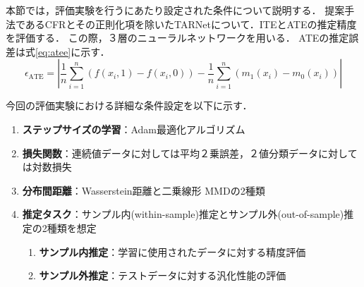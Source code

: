\documentclass[dvipdfmx]{jreport}
\begin{document}
本節では，評価実験を行うにあたり設定された条件について説明する．
提案手法であるCFRとその正則化項を除いたTARNetについて．ITEとATEの推定精度を評価する．
この際，３層のニューラルネットワークを用いる．
ATEの推定誤差は式\eqref{eq:atee}に示す．
\begin{equation}
    \epsilon_{\mathrm{ATE}} = \left| \frac{1}{n} \sum_{i=1}^{n} \left( f(x_i, 1) - f(x_i, 0) \right) - \frac{1}{n} \sum_{i=1}^{n} \left( m_1(x_i) - m_0(x_i) \right) \right| \label{eq:atee}
\end{equation}

今回の評価実験における詳細な条件設定を以下に示す．
\begin{tcolorbox}[title=\textbf{評価実験の条件設定}]
    \begin{enumerate}
        \item \textbf{ステップサイズの学習}：Adam最適化アルゴリズム
        \item \textbf{損失関数}：連続値データに対しては平均２乗誤差，２値分類データに対しては対数損失
        \item \textbf{分布間距離}：Wasserstein距離と二乗線形 MMDの2種類
        \item \textbf{推定タスク}：サンプル内(within-sample)推定とサンプル外(out-of-sample)推定の2種類を想定
        \begin{enumerate}
            \item \textbf{サンプル内推定}：学習に使用されたデータに対する精度評価
            \item \textbf{サンプル外推定}：テストデータに対する汎化性能の評価
        \end{enumerate}
    \end{enumerate}
\end{tcolorbox}

\end{document}
